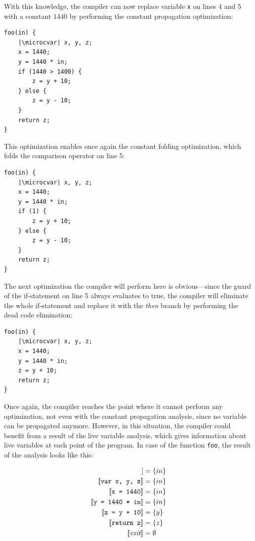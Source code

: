 \documentclass[thesis=M,english]{FITthesis}[2019/12/23]
\newcommand{\microcvar}{\textcolor{codegreen}{\textbf{var}}}
\begin{document}
With this knowledge, the compiler can now replace variable \texttt{x} on lines 4 and 5 with a constant $1440$ by performing the constant propagation optimization:

\begin{verbatim}
foo(in) {
	|\microcvar| x, y, z;
	x = 1440;
	y = 1440 * in;
	if (1440 > 1400) {
		z = y + 10;
	} else {
		z = y - 10;
	}
	return z;
}
\end{verbatim}

This optimization enables once again the constant folding optimization, which folds the comparison operator on line 5:

\begin{verbatim}
foo(in) {
	|\microcvar| x, y, z;
	x = 1440;
	y = 1440 * in;
	if (1) {
		z = y + 10;
	} else {
		z = y - 10;
	}
	return z;
}
\end{verbatim}

The next optimization the compiler will perform here is obvious---since the guard of the if-statement on line 5 always evaluates to true, the compiler will eliminate the whole if-statement and replace it with the \emph{then} branch by performing the dead code elimination:

\begin{verbatim}
foo(in) {
	|\microcvar| x, y, z;
	x = 1440;
	y = 1440 * in;
	z = y + 10;
	return z;
}
\end{verbatim}

Once again, the compiler reaches the point where it cannot perform any optimization, not even with the constant propagation analysis, since no variable can be propagated anymore. However, in this situation, the compiler could benefit from a result of the live variable analysis, which gives information about live variables at each point of the program. In case of the function \texttt{foo}, the result of the analysis looks like this:

\begin{align*}
    [\![ \emph{entry} ]\!] &= \{ in \}\\
    [\![ \texttt{var x, y, z} ]\!] &= \{ in \}\\
    [\![ \texttt{x = 1440} ]\!] &= \{ in \}\\
    [\![ \texttt{y = 1440 * in} ]\!] &= \{ in \}\\
    [\![ \texttt{z = y + 10} ]\!] &= \{ y \}\\
    [\![ \texttt{return z} ]\!] &= \{ z \}\\
    [\![ \emph{exit} ]\!] &= \emptyset\\
\end{align*}
\end{document}
